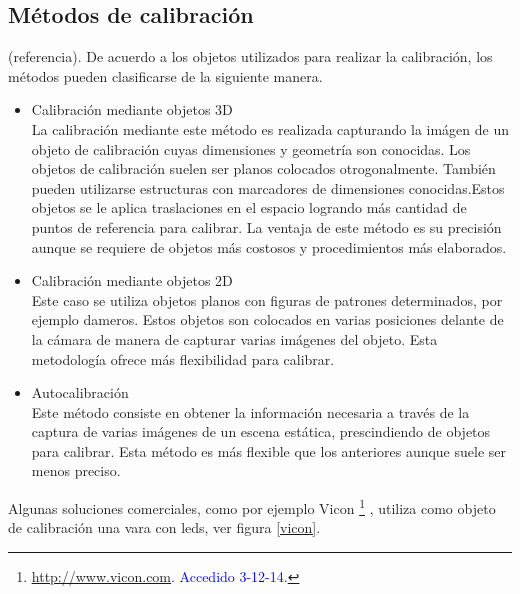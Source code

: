 \subsection{Métodos de calibración}

(referencia). De acuerdo a los objetos utilizados para realizar la calibración, los métodos pueden clasificarse de la siguiente manera.\\

\begin{itemize}
\item Calibración mediante objetos 3D\\

La calibración mediante este método es realizada capturando la imágen de un objeto de calibración cuyas dimensiones y geometría son conocidas. Los objetos de calibración suelen ser planos colocados otrogonalmente. También pueden utilizarse estructuras con marcadores de dimensiones conocidas.Estos objetos se le aplica traslaciones en el espacio logrando más cantidad de puntos de referencia para calibrar. La ventaja de este método es su precisión aunque se requiere de objetos más costosos y procedimientos más elaborados.\\

\item Calibración mediante objetos 2D\\

Este caso se utiliza objetos planos con figuras de patrones determinados, por ejemplo dameros. Estos objetos son colocados en varias posiciones delante de la cámara de manera de capturar varias imágenes del objeto. Esta metodología ofrece más flexibilidad para calibrar.\\

\item Autocalibración\\

Este método consiste en obtener la información necesaria a través de la captura de varias imágenes de un escena estática, prescindiendo de objetos para calibrar. Esta método es más flexible que  los anteriores aunque suele ser menos preciso.\\

\end{itemize}


Algunas soluciones comerciales, como por ejemplo Vicon \footnote{\textcolor{blue}{\underline{\url{http://www.vicon.com}}. Accedido 3-12-14.}} , utiliza como objeto de calibración una vara con leds, ver figura \ref{vicon}. 

